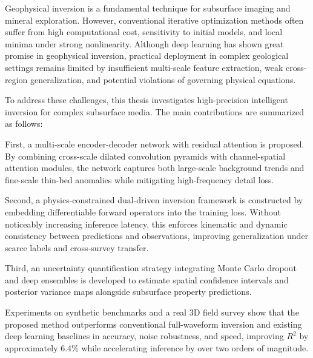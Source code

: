 \begin{abstracten}
Geophysical inversion is a fundamental technique for subsurface imaging and mineral exploration. However, conventional iterative optimization methods often suffer from high computational cost, sensitivity to initial models, and local minima under strong nonlinearity. Although deep learning has shown great promise in geophysical inversion, practical deployment in complex geological settings remains limited by insufficient multi-scale feature extraction, weak cross-region generalization, and potential violations of governing physical equations.

To address these challenges, this thesis investigates high-precision intelligent inversion for complex subsurface media. The main contributions are summarized as follows:

First, a multi-scale encoder-decoder network with residual attention is proposed. By combining cross-scale dilated convolution pyramids with channel-spatial attention modules, the network captures both large-scale background trends and fine-scale thin-bed anomalies while mitigating high-frequency detail loss.

Second, a physics-constrained dual-driven inversion framework is constructed by embedding differentiable forward operators into the training loss. Without noticeably increasing inference latency, this enforces kinematic and dynamic consistency between predictions and observations, improving generalization under scarce labels and cross-survey transfer.

Third, an uncertainty quantification strategy integrating Monte Carlo dropout and deep ensembles is developed to estimate spatial confidence intervals and posterior variance maps alongside subsurface property predictions.

Experiments on synthetic benchmarks and a real 3D field survey show that the proposed method outperforms conventional full-waveform inversion and existing deep learning baselines in accuracy, noise robustness, and speed, improving $R^2$ by approximately 6.4\% while accelerating inference by over two orders of magnitude.
\end{abstracten}
